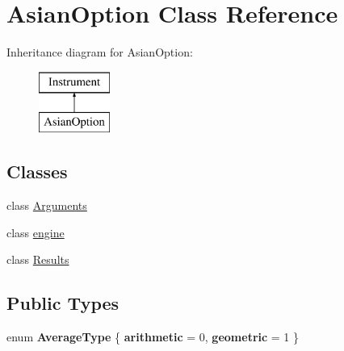 \hypertarget{class_asian_option}{}\section{Asian\+Option Class Reference}
\label{class_asian_option}
Inheritance diagram for Asian\+Option\+:\begin{figure}[H]
\begin{center}
\leavevmode
\includegraphics[height=2.000000cm]{class_asian_option}
\end{center}
\end{figure}
\subsection*{Classes}
\begin{DoxyCompactItemize}
\item 
class \hyperlink{class_asian_option_1_1_arguments}{Arguments}
\item 
class \hyperlink{class_asian_option_1_1engine}{engine}
\item 
class \hyperlink{class_asian_option_1_1_results}{Results}
\end{DoxyCompactItemize}
\subsection*{Public Types}
\begin{DoxyCompactItemize}
\item 
\hypertarget{class_asian_option_add7292791bf85820ff9fdbfd4407f3b9}{}\label{class_asian_option_add7292791bf85820ff9fdbfd4407f3b9} 
enum {\bfseries Average\+Type} \{ {\bfseries arithmetic} = 0, 
{\bfseries geometric} = 1
 \}
\end{DoxyCompactItemize}
